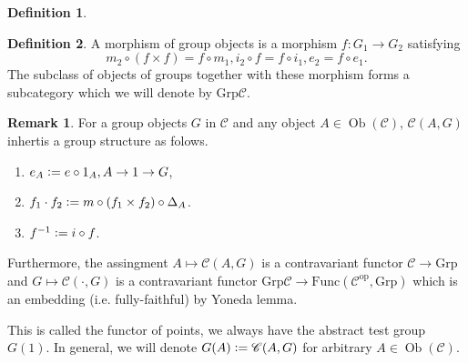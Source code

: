 \documentclass[10pt]{article}
\numberwithin{equation}{section}
\theoremstyle{definition}
\newtheorem{definition}{Definition}[section]
\newtheorem{remark}{Remark}[section]
\DeclareMathOperator{\id}{id}
\DeclareMathOperator{\Ob}{Ob}
\newcommand{\defeq}{\vcentcolon=}
\newcommand{\sC}[0]{\mathscr{C}}
\newcommand{\Grp}[0]{\mathrm{Grp}}
\newcommand{\op}[0]{\mathrm{op}}
\newcommand{\Func}[0]{\mathrm{Func}}
\begin{document}
\begin{definition}
\begin{enumerate}
        \begin{center}
        \end{center}
    \end{enumerate}
\end{definition}

\begin{definition}
    \label{definition_1_2}
    A morphism of group objects is a morphism $f:G_1\to G_2$ satisfying 
    \begin{equation*}
        m_2\circ(f\times f)= f\circ m_1, i_2\circ f = f\circ i_1, e_2 = f\circ e_1.
    \end{equation*}
    The subclass of objects of groups together with these morphism forms a subcategory which we will denote by $\Grp\sC$.
\end{definition}

\begin{remark}
    \label{remark_1_3}
    For a group objects $G$ in $\sC$ and any object $A\in\Ob(\sC)$, $\sC(A,G)$ inhertis a group structure as folows. 
    \begin{enumerate}
        \item $e_A\defeq e\circ 1_A,A \to 1\to G$,
        \item $f_1\cdot f_2\defeq m\circ(f_1\times f_2)\circ\Delta_A$.
        \item $f^{-1}\defeq i\circ f$.
    \end{enumerate}
    Furthermore, the assingment $A\mapsto \sC(A,G)$ is a contravariant functor $\sC\to \Grp$ and $G\mapsto\sC(\cdot,G)$ is a contravariant functor $\Grp\sC\to \Func(\sC^\op,\Grp)$
    which is an embedding (i.e. fully-faithful) by Yoneda lemma.
    \par This is called the functor of points, we always have the abstract test group $G(1)$. In general, we will denote $G(A) \defeq \sC(A,G)$ for arbitrary $A\in\Ob(\sC)$.
\end{remark}
\end{document}
